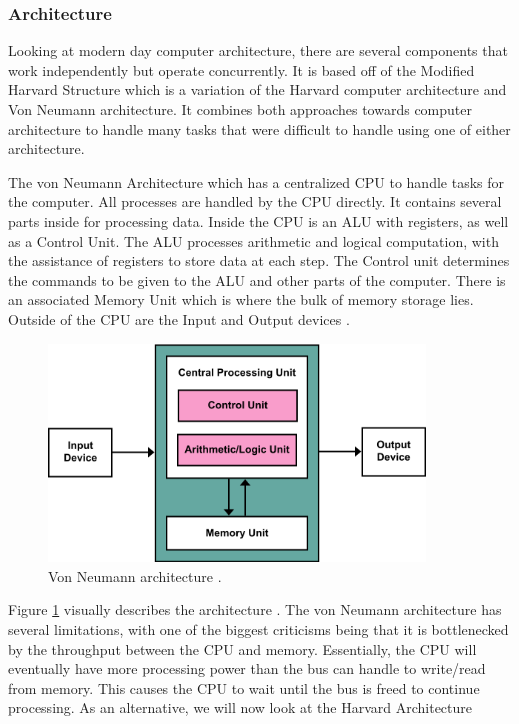 \subsubsection{Architecture}\label{subsubsec:Arch}

Looking at modern day computer architecture, there are several components that work independently but operate concurrently.
It is based off of the Modified Harvard Structure which is a variation of the Harvard computer architecture and Von Neumann architecture.
It combines both approaches towards computer architecture to handle many tasks that were difficult to handle using one of either architecture.

The von Neumann Architecture which has a centralized CPU to handle tasks for the computer.
All processes are handled by the CPU directly.
It contains several parts inside for processing data.
Inside the CPU is an ALU with registers, as well as a Control Unit.
The ALU processes arithmetic and logical computation, with the assistance of registers to store data at each step.
The Control unit determines the commands to be given to the ALU and other parts of the computer.
There is an associated Memory Unit which is where the bulk of memory storage lies.
Outside of the CPU are the Input and Output devices \cite{vonNeumannBook}.

\begin{figure}[htb]
    \centering
    \includegraphics[width=10cm]{Images/Von_Neumann_Architecture.png}
       \caption{Von Neumann architecture \cite{vonNeumannImg}.}
           \label{fig:VonNeumannArch}
\end{figure}

Figure \ref{fig:VonNeumannArch} visually describes the architecture \cite{vonNeumannImg}.
The von Neumann architecture has several limitations, with one of the biggest criticisms being that it is bottlenecked by the throughput between the CPU and memory.
Essentially, the CPU will eventually have more processing power than the bus can handle to write/read from memory.
This causes the CPU to wait until the bus is freed to continue processing.
As an alternative, we will now look at the Harvard Architecture

